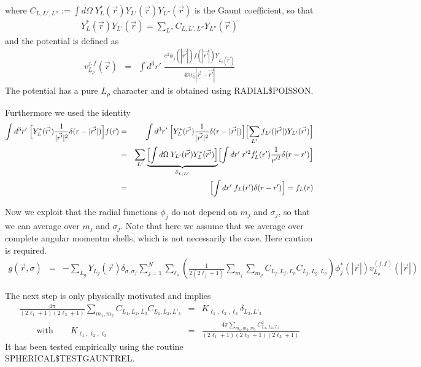 \documentclass[11pt,a4paper]{report}
\begin{document}
where $C_{L,L',L''}:=\int d\Omega\;
Y^*_L(\vec{r})Y_{L'}(\vec{r})Y_{L''}(\vec{r})$ is the Gaunt
coefficient, so that
\begin{eqnarray*}
Y^*_L(\vec{r})Y_{L'}(\vec{r})=\sum_{L''}C_{L,L',L''}Y_{L''}(\vec{r})
\end{eqnarray*}
and the potential is defined as
\begin{eqnarray*}
v_{L_\rho}^{j,f}(\vec{r})&=&\int d^3r'\;
\frac{e^2\phi_j(|\vec{r'}|)f(|\vec{r'}|)Y_{L_{\rho}(\vec{r'})}}
{4\pi\epsilon_0|\vec{r}-\vec{r'}|}
\end{eqnarray*}
The potential has a pure $L_\rho$ character and is obtained using
RADIAL\$POISSON.

Furthermore we used the identity
\begin{eqnarray*}
\int d^3r'\;  \Bigl[Y^*_L(\vec{r'})\frac{1}{|\vec{r'}|^2}
\delta(r-|\vec{r'}|)\Bigr]f(\vec{r})
&=&\int d^3r'\;  
\Bigl[Y^*_L(\vec{r'})\frac{1}{|\vec{r'}|^2}\delta(r-|\vec{r'}|)\Bigr]
\Bigl[\sum_{L'}f_{L'}(|\vec{r'}|)Y_{L'}(\vec{r'})\Bigr]
\\
&=&\sum_{L'}
\underbrace{\Bigl[\int d\Omega\; Y_{L'}(\vec{r'}) Y^*_L(\vec{r'})\Bigr]}_{\delta_{L,L'}}
\Bigl[\int dr'\;r'^2 f_L'(r')\frac{1}{{r'}^2}\delta(r-r')\Bigr]
\\
&=&\Bigl[\int dr'\;f_L(r')\delta(r-r')\Bigr]
=f_L(r)
\end{eqnarray*}


Now we exploit that the radial functions $\phi_j$ do not depend on
$m_j$ and $\sigma_j$, so that we can average over $m_j$ and
$\sigma_j$. Note that here we assume that we average over complete
angular momentm shells, which is not necessarily the case. Here
caution is required.
\begin{eqnarray*}
g(\vec{r},\sigma)
&=&-\sum_{L_g}Y_{L_g}(\vec{r})\delta_{\sigma,\sigma_f}
\sum_{j=1}^N
\sum_{\ell_\rho}
\left(\frac{1}{2(2\ell_j+1)}
\sum_{m_j}\sum_{m_\rho}C_{L_j,L_f,L_\rho} C_{L_j,L_g,L_\rho}\right)
\phi_j^*(|\vec{r}|)v_{L_\rho}^{(j,f)}(|\vec{r}|)
\end{eqnarray*}

The next step is only physically motivated and implies
\begin{eqnarray*}
\frac{4\pi}{ (2\ell_1+1)(2\ell_2+1)}
\sum_{m_1,m_2}C_{L_1,L_2,L_3} C_{L_1,L_2,L'_3}&=&K_{\ell_1,\ell_2,\ell_3}\delta_{L_3,L'_3}
\\
\qquad\text{with}\qquad K_{\ell_1,\ell_2,\ell_3}&=&
\frac{4\pi\sum_{m_1,m_2,m_3}C_{L_1,L_2,L_3}^2}
{(2\ell_1+1)(2\ell_2+1)(2\ell_3+1)}
\end{eqnarray*}
It has been tested empirically using the routine SPHERICAL\$TESTGAUNTREL.
\end{document}
